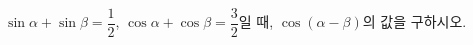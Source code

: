 $\sin\alpha+\sin\beta=\dfrac{1}{2}$, $\cos\alpha+\cos\beta=\dfrac{3}{2}$일 때, $\cos(\alpha-\beta)$의 값을 구하시오.
